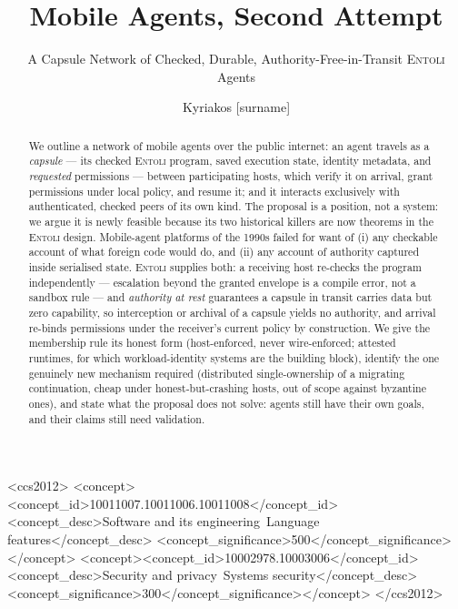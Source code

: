 \documentclass[sigplan,10pt]{acmart}
\begin{document}
\title{Mobile Agents, Second Attempt}
\subtitle{A Capsule Network of Checked, Durable, Authority-Free-in-Transit \textsc{Entoli} Agents}

\author{Kyriakos [surname]}

\begin{abstract}
We outline a network of mobile agents over the public internet: an agent
travels as a \emph{capsule} --- its checked \textsc{Entoli} program, saved
execution state, identity metadata, and \emph{requested} permissions ---
between participating hosts, which verify it on arrival, grant permissions
under local policy, and resume it; and it interacts exclusively with
authenticated, checked peers of its own kind. The proposal is a position,
not a system: we argue it is newly feasible because its two historical
killers are now theorems in the \textsc{Entoli} design. Mobile-agent
platforms of the 1990s failed for want of (i) any checkable account of
what foreign code would do, and (ii) any account of authority captured
inside serialised state. \textsc{Entoli} supplies both: a receiving host
re-checks the program independently --- escalation beyond the granted
envelope is a compile error, not a sandbox rule --- and \emph{authority at
rest} guarantees a capsule in transit carries data but zero capability, so
interception or archival of a capsule yields no authority, and arrival
re-binds permissions under the receiver's current policy by construction.
We give the membership rule its honest form (host-enforced, never
wire-enforced; attested runtimes, for which workload-identity systems are
the building block), identify the one genuinely new mechanism required
(distributed single-ownership of a migrating continuation, cheap under
honest-but-crashing hosts, out of scope against byzantine ones), and state
what the proposal does not solve: agents still have their own goals, and
their claims still need validation.
\end{abstract}

\begin{CCSXML}
<ccs2012>
<concept><concept_id>10011007.10011006.10011008</concept_id>
<concept_desc>Software and its engineering~Language features</concept_desc>
<concept_significance>500</concept_significance></concept>
<concept><concept_id>10002978.10003006</concept_id>
<concept_desc>Security and privacy~Systems security</concept_desc>
<concept_significance>300</concept_significance></concept>
</ccs2012>
\end{CCSXML}
\end{document}
